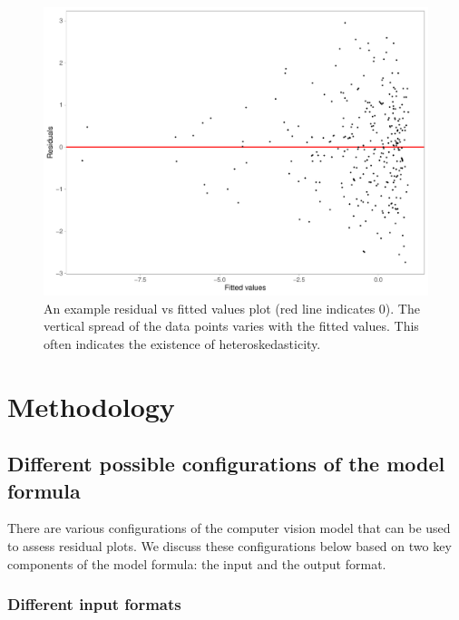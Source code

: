 \documentclass[]{interact}
\theoremstyle{plain}%
\theoremstyle{definition}
\theoremstyle{remark}
\begin{document}
\begin{figure}

{\centering \includegraphics[width=1\linewidth]{paper_files/figure-latex/false-finding-1} 

}

\caption{An example residual vs fitted values plot (red line indicates 0). The vertical spread of the data points varies with the fitted values. This often indicates the existence of heteroskedasticity.}\label{fig:false-finding}
\end{figure}

\hypertarget{methodology}{%
\section{Methodology}\label{methodology}}

\hypertarget{different-possible-configurations-of-the-model-formula}{%
\subsection{Different possible configurations of the model
formula}\label{different-possible-configurations-of-the-model-formula}}

There are various configurations of the computer vision model that can
be used to assess residual plots. We discuss these configurations below
based on two key components of the model formula: the input and the
output format.

\hypertarget{different-input-formats}{%
\subsubsection{Different input formats}\label{different-input-formats}}
\end{document}
